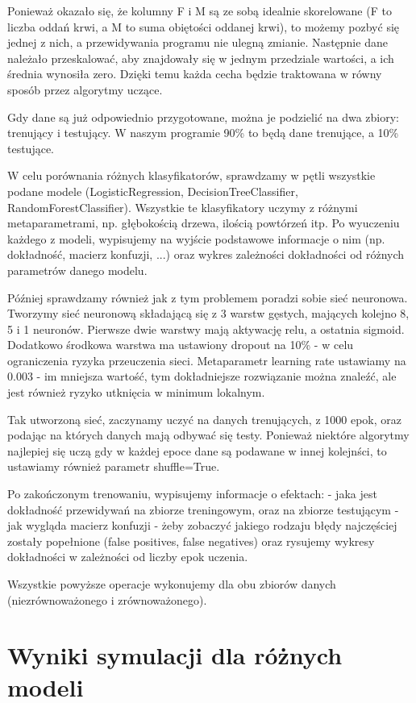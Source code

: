 \documentclass[11pt, a4paper, notitlepage]{report}
\begin{document}
Ponieważ okazało się, że kolumny F i M są ze sobą idealnie skorelowane (F to liczba oddań krwi, a M to suma obiętości oddanej krwi), to możemy pozbyć się jednej z nich, a przewidywania programu nie ulegną zmianie.
Następnie dane należało przeskalować, aby znajdowały się w jednym przedziale wartości, a ich średnia wynosiła zero.
Dzięki temu każda cecha będzie traktowana w równy sposób przez algorytmy uczące.


Gdy dane są już odpowiednio przygotowane, można je podzielić na dwa zbiory: trenujący i testujący.
W naszym programie 90\% to będą dane trenujące, a 10\% testujące.

W celu porównania różnych klasyfikatorów, sprawdzamy w pętli wszystkie podane modele (LogisticRegression, DecisionTreeClassifier, RandomForestClassifier).
Wszystkie te klasyfikatory uczymy z różnymi metaparametrami, np. głębokością drzewa, ilością powtórzeń itp.
Po wyuczeniu każdego z modeli, wypisujemy na wyjście podstawowe informacje o nim (np. dokładność, macierz konfuzji, ...) oraz wykres zależności dokładności od różnych parametrów danego modelu.

Później sprawdzamy również jak z tym problemem poradzi sobie sieć neuronowa.
Tworzymy sieć neuronową składającą się z 3 warstw gęstych, mających kolejno 8, 5 i 1 neuronów.
Pierwsze dwie warstwy mają aktywację relu, a ostatnia sigmoid.
Dodatkowo środkowa warstwa ma ustawiony dropout na 10\% - w celu ograniczenia ryzyka przeuczenia sieci.
Metaparametr learning rate ustawiamy na 0.003 - im mniejsza wartość, tym dokładniejsze rozwiązanie można znaleźć, ale jest również ryzyko utknięcia w minimum lokalnym.

Tak utworzoną sieć, zaczynamy uczyć na danych trenujących, z 1000 epok, oraz podając na których danych mają odbywać się testy.
Ponieważ niektóre algorytmy najlepiej się uczą gdy w każdej epoce dane są podawane w innej kolejnści, to ustawiamy również parametr shuffle=True.

Po zakończonym trenowaniu, wypisujemy informacje o efektach:
- jaka jest dokładność przewidywań na zbiorze treningowym, oraz na zbiorze testującym
- jak wygląda macierz konfuzji - żeby zobaczyć jakiego rodzaju błędy najczęściej zostały popełnione (false positives, false negatives)
oraz rysujemy wykresy dokładności w zależności od liczby epok uczenia.

Wszystkie powyższe operacje wykonujemy dla obu zbiorów danych (niezrównoważonego i zrównoważonego).

\section{Wyniki symulacji dla różnych modeli}
\end{document}
